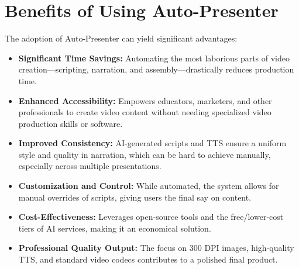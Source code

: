 \documentclass{article}
\begin{document}
\section{Benefits of Using Auto-Presenter}
The adoption of Auto-Presenter can yield significant advantages:
\begin{itemize}
    \item \textbf{Significant Time Savings:} Automating the most laborious parts of video creation—scripting, narration, and assembly—drastically reduces production time.
    \item \textbf{Enhanced Accessibility:} Empowers educators, marketers, and other professionals to create video content without needing specialized video production skills or software.
    \item \textbf{Improved Consistency:} AI-generated scripts and TTS ensure a uniform style and quality in narration, which can be hard to achieve manually, especially across multiple presentations.
    \item \textbf{Customization and Control:} While automated, the system allows for manual overrides of scripts, giving users the final say on content.
    \item \textbf{Cost-Effectiveness:} Leverages open-source tools and the free/lower-cost tiers of AI services, making it an economical solution.
    \item \textbf{Professional Quality Output:} The focus on 300 DPI images, high-quality TTS, and standard video codecs contributes to a polished final product.
\end{itemize}
\end{document}
